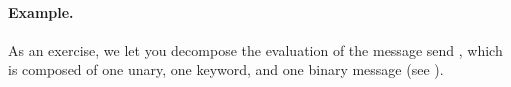 \documentclass[a4paper,10pt,twoside]{book}
\begin{document}



\paragraph{Example.}
As an exercise, we let you decompose the evaluation of the message send , which is composed of one unary, one keyword, and one binary message (see ).


\end{document}
